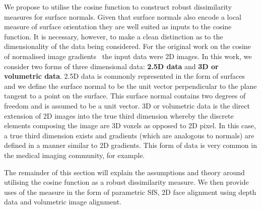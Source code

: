 We propose to utilise the cosine function to construct robust dissimilarity
measures for surface normals. Given that surface normals also encode a local
measure of surface orientation they are well suited as inputs to the cosine
function. It is necessary, however, to make a clean distinction as to the
dimensionality of the data being considered. For the original work
on the cosine of normalised image gradients~\cite{tzimiropoulos2012subspace}
the input data were 2D images. In this work, we consider two forms of three
dimensional data: \textbf{2.5D data} and \textbf{3D or volumetric data}.
2.5D data is commonly represented in the form of surfaces and we define
the surface normal to be the unit vector perpendicular to the plane
tangent to a point on the surface. This surface normal contains
two degrees of freedom and is assumed to be a unit vector. 3D or volumetric
data is the direct extension of 2D images into the true third dimension
whereby the discrete elements composing the image are 3D voxels as opposed to
2D pixel. In this case, a true third dimension exists and gradients (which
are analogous to normals) are defined in a manner similar to 2D gradients. This
form of data is very common in the medical imaging community, for example.

The remainder of this section will explain the assumptions and theory around
utilising the cosine function as a robust dissimilarity measure. We then
provide uses of the measure in the form of parametric SfS, 2D face
alignment using depth data and volumetric image alignment.
